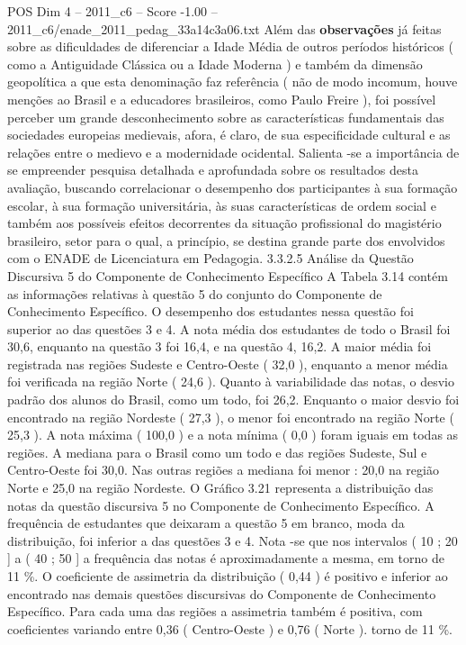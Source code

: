 \begin{textsample}{POS Dim 4 – 2011\_c6 – Score -1.00 – 2011\_c6/enade\_2011\_pedag\_33a14c3a06.txt}
Além das \textbf{observações} já feitas sobre as dificuldades de diferenciar a Idade Média de outros períodos históricos ( como a Antiguidade Clássica ou a Idade Moderna ) e também da dimensão geopolítica a que esta denominação faz referência ( não de modo incomum, houve menções ao Brasil e a educadores brasileiros, como Paulo Freire ), foi possível perceber um grande desconhecimento sobre as características fundamentais das sociedades europeias medievais, afora, é claro, de sua especificidade cultural e as relações entre o medievo e a modernidade ocidental.
Salienta -se a importância de se empreender pesquisa detalhada e aprofundada sobre os resultados desta avaliação, buscando correlacionar o desempenho dos participantes à sua formação escolar, à sua formação universitária, às suas características de ordem social e também aos possíveis efeitos decorrentes da situação profissional do magistério brasileiro, setor para o qual, a princípio, se destina grande parte dos envolvidos com o ENADE de Licenciatura em Pedagogia. 3.3.2.5 Análise da Questão Discursiva 5 do Componente de Conhecimento Específico A Tabela 3.14 contém as informações relativas à questão 5 do conjunto do Componente de Conhecimento Específico.
O desempenho dos estudantes nessa questão foi superior ao das questões 3 e 4.
A nota média dos estudantes de todo o Brasil foi 30,6, enquanto na questão 3 foi 16,4, e na questão 4, 16,2.
A maior média foi registrada nas regiões Sudeste e Centro-Oeste ( 32,0 ), enquanto a menor média foi verificada na região Norte ( 24,6 ).
Quanto à variabilidade das notas, o desvio padrão dos alunos do Brasil, como um todo, foi 26,2.
Enquanto o maior desvio foi encontrado na região Nordeste ( 27,3 ), o menor foi encontrado na região Norte ( 25,3 ).
A nota máxima ( 100,0 ) e a nota mínima ( 0,0 ) foram iguais em todas as regiões.
A mediana para o Brasil como um todo e das regiões Sudeste, Sul e Centro-Oeste foi 30,0.
Nas outras regiões a mediana foi menor : 20,0 na região Norte e 25,0 na região Nordeste.
O Gráfico 3.21 representa a distribuição das notas da questão discursiva 5 no Componente de Conhecimento Específico.
A frequência de estudantes que deixaram a questão 5 em branco, moda da distribuição, foi inferior a das questões 3 e 4.
Nota -se que nos intervalos ( 10 ; 20 ] a ( 40 ; 50 ] a frequência das notas é aproximadamente a mesma, em torno de 11 \%.
O coeficiente de assimetria da distribuição ( 0,44 ) é positivo e inferior ao encontrado nas demais questões discursivas do Componente de Conhecimento Específico.
Para cada uma das regiões a assimetria também é positiva, com coeficientes variando entre 0,36 ( Centro-Oeste ) e 0,76 ( Norte ). torno de 11 \%.

\end{textsample}
